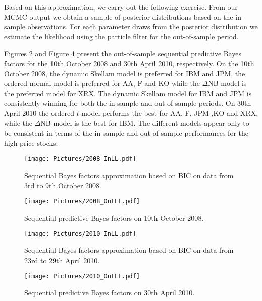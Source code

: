 \documentclass[12pt]{article}
\begin{document}
Based on this approximation, we carry out the following exercise.
From our MCMC output we obtain a sample of posterior distributions
based on the in-sample observations.
For each parameter draws from the posterior distribution we
estimate the likelihood using the particle filter for the out-of-sample period.

Figures \ref{c_pic:2008_pred} and Figure \ref{c_pic:2010_pred} present
the out-of-sample sequential predictive Bayes factors for the
10th October 2008 and 30th April 2010, respectively. %
On the 10th October 2008, the dynamic Skellam model is preferred for
IBM and JPM, the ordered normal model is preferred for AA, F and KO while the
$\Delta$NB model is the preferred model for XRX.
The dynamic Skellam model for IBM and JPM is consistently winning for
both the in-sample and out-of-sample periods.
On 30th April 2010 the ordered $t$ model performs the best for AA,
F, JPM ,KO and XRX, while the $\Delta$NB model is the best for IBM.
The different models appear only to be consistent in terms of the
in-sample and out-of-sample performances for the high price stocks.   


\begin{figure}[!htp]
  \centering 
\texttt{[image: Pictures/2008\_InLL.pdf]}
       \caption{ Sequential Bayes factors approximation based on BIC  on data from 3rd to 9th October 2008.}
 \label{c_pic:2008_in}
 \end{figure} 
\begin{figure}[!htp]
  \centering 
\texttt{[image: Pictures/2008\_OutLL.pdf]}
       \caption{ Sequential predictive Bayes factors on 10th October 2008.}
 \label{c_pic:2008_pred}
 \end{figure}  
\begin{figure}[!htp]
  \centering 
\texttt{[image: Pictures/2010\_InLL.pdf]}
       \caption{ Sequential Bayes factors approximation based on BIC  on data from  23rd to 29th  April 2010.}
 \label{c_pic:2010_in}
 \end{figure} 
\begin{figure}[!htp]
  \centering 
\texttt{[image: Pictures/2010\_OutLL.pdf]}
       \caption{ Sequential predictive Bayes factors on 30th April 2010.}
 \label{c_pic:2010_pred}
 \end{figure}  
\end{document}
